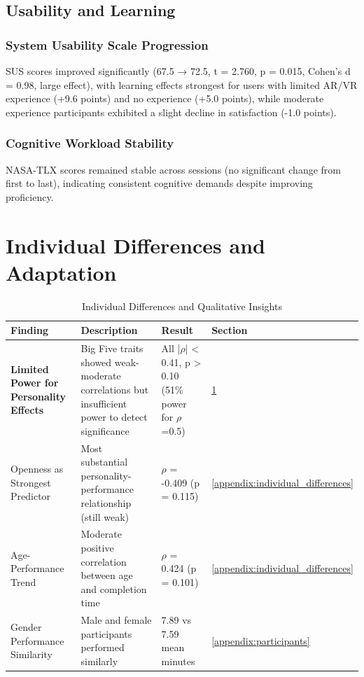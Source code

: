 \subsection{Usability and Learning}\label{sec:usability}

\subsubsection{System Usability Scale Progression}

SUS scores improved significantly (67.5 → 72.5, t = 2.760, p = 0.015, Cohen's d = 0.98, large effect), with learning effects strongest for users with limited AR/VR experience (+9.6 points) and no experience (+5.0 points), while moderate experience participants exhibited a slight decline in satisfaction (-1.0 points).

\subsubsection{Cognitive Workload Stability}

NASA-TLX scores remained stable across sessions (no significant change from first to last), indicating consistent cognitive demands despite improving proficiency.

\section{Individual Differences and Adaptation}\label{sec:individual_differences}

\begin{table}[!t]
\centering
\caption{Individual Differences and Qualitative Insights}
\label{tab:individual_qualitative_summary}
\begin{tabular}{@{}p{3.2cm}p{5.5cm}p{3.2cm}p{2.3cm}@{}}
\toprule
\textbf{Finding} & \textbf{Description} & \textbf{Result} & \textbf{Section} \\
\midrule
\textbf{Limited Power for Personality Effects} & Big Five traits showed weak-moderate correlations but insufficient power to detect significance & All |$\rho$| < 0.41, p > 0.10 (51\% power for $\rho$=0.5) & \ref{sec:individual_differences} \\
Openness as Strongest Predictor & Most substantial personality-performance relationship (still weak) & $\rho$ = -0.409 (p = 0.115) & \ref{appendix:individual_differences} \\
Age-Performance Trend & Moderate positive correlation between age and completion time & $\rho$ = 0.424 (p = 0.101) & \ref{appendix:individual_differences} \\
Gender Performance Similarity & Male and female participants performed similarly & 7.89 vs 7.59 mean minutes & \ref{appendix:participants} \\
\bottomrule
\end{tabular}
\end{table}


